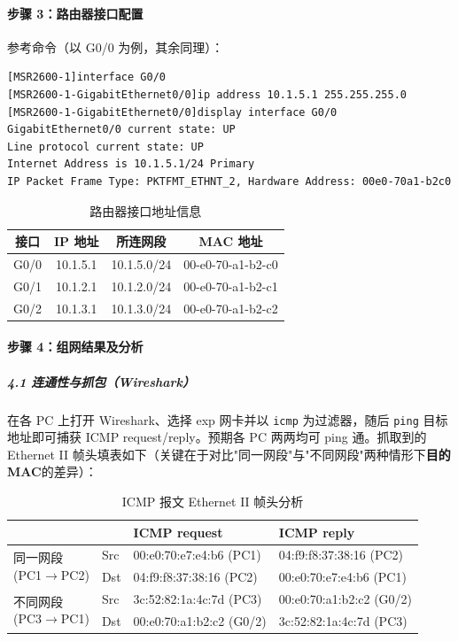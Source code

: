 \documentclass[12pt,a4paper]{article}
\begin{document}
\paragraph{步骤 3：路由器接口配置}
参考命令（以 G0/0 为例，其余同理）：
\begin{lstlisting}[style=cli]
[MSR2600-1]interface G0/0
[MSR2600-1-GigabitEthernet0/0]ip address 10.1.5.1 255.255.255.0
[MSR2600-1-GigabitEthernet0/0]display interface G0/0
GigabitEthernet0/0 current state: UP
Line protocol current state: UP
Internet Address is 10.1.5.1/24 Primary
IP Packet Frame Type: PKTFMT_ETHNT_2, Hardware Address: 00e0-70a1-b2c0
\end{lstlisting}

\begin{table}[H]
\centering
\caption{路由器接口地址信息}
\begin{tabular}{cccc}
\toprule
接口 & IP 地址 & 所连网段 & MAC 地址 \\
\midrule
G0/0 & 10.1.5.1 & 10.1.5.0/24 & 00-e0-70-a1-b2-c0 \\
G0/1 & 10.1.2.1 & 10.1.2.0/24 & 00-e0-70-a1-b2-c1 \\
G0/2 & 10.1.3.1 & 10.1.3.0/24 & 00-e0-70-a1-b2-c2 \\
\bottomrule
\end{tabular}
\end{table}

\paragraph{步骤 4：组网结果及分析}

\subparagraph{4.1 连通性与抓包（Wireshark）}
在各 PC 上打开 Wireshark、选择 exp 网卡并以 \texttt{icmp} 为过滤器，随后 \lstinline|ping| 目标地址即可捕获 ICMP request/reply。预期各 PC 两两均可 ping 通。抓取到的 Ethernet II 帧头填表如下（关键在于对比"同一网段"与"不同网段"两种情形下\textbf{目的 MAC}的差异）：

\begin{table}[H]
\centering
\caption{ICMP 报文 Ethernet II 帧头分析}
\begin{tabular}{p{2.6cm}p{2.2cm}p{4.6cm}p{4.6cm}}
\toprule
& & \textbf{ICMP request} & \textbf{ICMP reply} \\
\midrule
\multirow{2}{*}{\parbox{2.6cm}{同一网段\\(PC1$\to$PC2)}}
 & Src & 00:e0:70:e7:e4:b6 (PC1) & 04:f9:f8:37:38:16 (PC2) \\
 & Dst & 04:f9:f8:37:38:16 (PC2) & 00:e0:70:e7:e4:b6 (PC1) \\
\midrule
\multirow{2}{*}{\parbox{2.6cm}{不同网段\\(PC3$\to$PC1)}}
 & Src & 3c:52:82:1a:4c:7d (PC3) & 00:e0:70:a1:b2:c2 (G0/2) \\
 & Dst & 00:e0:70:a1:b2:c2 (G0/2) & 3c:52:82:1a:4c:7d (PC3) \\
\bottomrule
\end{tabular}
\end{table}
\end{document}

